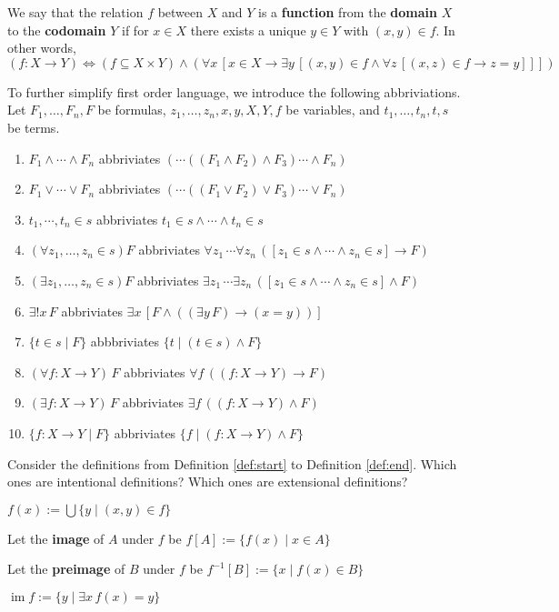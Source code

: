 \documentclass[11pt]{book}
\newcommand{\env}[2]{\begin{#1}#2\end{#1}}
\DeclareMathOperator{\im}{\operatorname{im}}
\begin{document}
\env{definition}{We say that the relation $f$ between  $X$ and $Y$ is a \textbf{function} from the \textbf{domain} $X$ to the \textbf{codomain} $Y$ if for $x\in X$ there exists a unique $y\in Y$ with $(x,y)\in f$. In other words,
\[(f:X\rightarrow Y)\Longleftrightarrow (f\subseteq X\times Y)\land(\forall x\,[x\in X\rightarrow \exists y\,[(x,y)\in f\land \forall z\,[(x,z)\in f\rightarrow z=y]]])\]}

\begin{remark}To further simplify first order language, we introduce the following abbriviations. Let $F_1,\dots,F_n,F$ be formulas, $z_1,\dots,z_n,x,y,X,Y,f$ be variables, and $t_1,\dots,t_n,t,s$ be terms.
\env{enumerate}{
	\item $F_1\land \cdots\land F_n$ abbriviates $(\cdots((F_1\land F_2)\land F_3)\cdots \land F_n)$
	\item $F_1\lor \cdots\lor F_n$ abbriviates $(\cdots((F_1\lor F_2)\lor F_3)\cdots \lor F_n)$
	\item $t_1,\cdots,t_n\in s$ abbriviates $t_1\in s\land\cdots \land t_n\in s$
	\item $(\forall z_1,\dots,z_n\in s) F$ abbriviates $\forall z_1\,\cdots\forall z_n\,([z_1\in s\land \cdots\land z_n\in s]\rightarrow F)$
	\item $(\exists z_1,\dots,z_n\in s) F$ abbriviates $\exists z_1\,\cdots\exists z_n\,([z_1\in s\land\cdots\land z_n\in s]\land F)$
	\item $\exists! x\, F$ abbriviates $\exists x\, [F\land ((\exists y\, F)\rightarrow (x=y))]$
	\item $\{t\in s\mid F\}$ abbbriviates $\{t\mid (t\in s)\land F\}$
	\item $(\forall f:X\rightarrow Y)\,F$ abbriviates $\forall f\,((f:X\rightarrow Y)\rightarrow F)$
	\item $(\exists f:X\rightarrow Y)\,F$ abbriviates $\exists f\,((f:X\rightarrow Y)\land F)$
	\item $\{f:X\rightarrow Y\mid F\}$ abbriviates $\{f\mid (f:X\rightarrow Y)\land F\}$
}
\end{remark}
\newpage
\env{exercise}{Consider the definitions from Definition \ref{def:start} to Definition \ref{def:end}. Which ones are intentional definitions? Which ones are extensional definitions?}
\env{definition}{\label{def:start}$f(x):=\bigcup\{y\mid(x,y)\in f\}$}
\env{definition}{Let the \textbf{image} of $A$ under $f$ be $f[A]:=\{f(x)\mid x\in A\}$}
\env{definition}{Let the \textbf{preimage} of $B$ under $f$ be $f^{-1}[B]:=\{x\mid f(x)\in B\}$}
\env{definition}{$\im f:=\{y\mid \exists x\,f(x)=y\}$}
\end{document}
